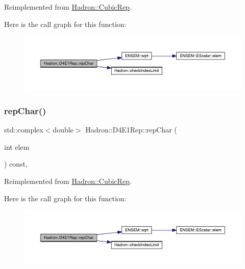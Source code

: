 Reimplemented from \mbox{\hyperlink{structHadron_1_1CubicRep_af45227106e8e715e84b0af69cd3b36f8}{Hadron\+::\+Cubic\+Rep}}.

Here is the call graph for this function\+:
\nopagebreak
\begin{figure}[H]
\begin{center}
\leavevmode
\includegraphics[width=350pt]{da/d78/structHadron_1_1D4E1Rep_a5c4eb87d8e59c8653c6d4da163c300ea_cgraph}
\end{center}
\end{figure}
\mbox{\label{structHadron_1_1D4E1Rep_a5c4eb87d8e59c8653c6d4da163c300ea}} 
\subsubsection{\texorpdfstring{repChar()}{repChar()}\hspace{0.1cm}{\footnotesize\ttfamily [3/3]}}
{\footnotesize\ttfamily std\+::complex$<$double$>$ Hadron\+::\+D4\+E1\+Rep\+::rep\+Char (\begin{DoxyParamCaption}\item[{int}]{elem }\end{DoxyParamCaption}) const\hspace{0.3cm}{\ttfamily [inline]}, {\ttfamily [virtual]}}



Reimplemented from \mbox{\hyperlink{structHadron_1_1CubicRep_af45227106e8e715e84b0af69cd3b36f8}{Hadron\+::\+Cubic\+Rep}}.

Here is the call graph for this function\+:
\nopagebreak
\begin{figure}[H]
\begin{center}
\leavevmode
\includegraphics[width=350pt]{da/d78/structHadron_1_1D4E1Rep_a5c4eb87d8e59c8653c6d4da163c300ea_cgraph}
\end{center}
\end{figure}
\mbox{\label{structHadron_1_1D4E1Rep_a8a0fcfa06e2a36d6835bab2431654a2f}} 
